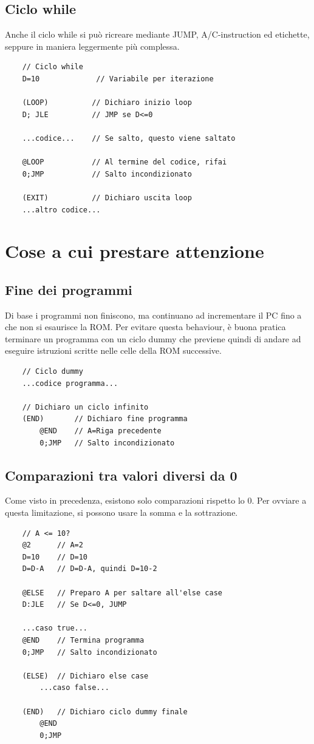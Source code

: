 \documentclass[12pt]{article}
\begin{document}
\pagebreak
\subsection{Ciclo while}
\label{ssec:while}
Anche il ciclo while si può ricreare mediante JUMP, A/C-instruction ed etichette, seppure in maniera leggermente più complessa.
\begin{lstlisting}
    // Ciclo while
    D=10             // Variabile per iterazione

    (LOOP)          // Dichiaro inizio loop
    D; JLE          // JMP se D<=0
    
    ...codice...    // Se salto, questo viene saltato

    @LOOP           // Al termine del codice, rifai
    0;JMP           // Salto incondizionato

    (EXIT)          // Dichiaro uscita loop
    ...altro codice...
\end{lstlisting}

\pagebreak
\section{Cose a cui prestare attenzione}
\label{sec:nb_1}

\subsection{Fine dei programmi}
\label{ssec:fine_programma}
Di base i programmi non finiscono, ma continuano ad incrementare il PC fino a che non si esaurisce la ROM.
Per evitare questa behaviour, è buona pratica terminare un programma con un ciclo dummy che previene quindi di andare ad eseguire istruzioni scritte nelle celle della ROM successive.
\begin{lstlisting}
    // Ciclo dummy
    ...codice programma...
    
    // Dichiaro un ciclo infinito
    (END)       // Dichiaro fine programma
        @END    // A=Riga precedente
        0;JMP   // Salto incondizionato
\end{lstlisting}

\subsection{Comparazioni tra valori diversi da 0}
\label{ssec:compare_values}
Come visto in precedenza, esistono solo comparazioni rispetto lo 0. Per ovviare a questa limitazione, si possono usare la somma e la sottrazione.
\begin{lstlisting}
    // A <= 10?
    @2      // A=2
    D=10    // D=10
    D=D-A   // D=D-A, quindi D=10-2

    @ELSE   // Preparo A per saltare all'else case
    D:JLE   // Se D<=0, JUMP

    ...caso true...
    @END    // Termina programma
    0;JMP   // Salto incondizionato

    (ELSE)  // Dichiaro else case
        ...caso false...

    (END)   // Dichiaro ciclo dummy finale
        @END
        0;JMP
\end{lstlisting}
\end{document}
